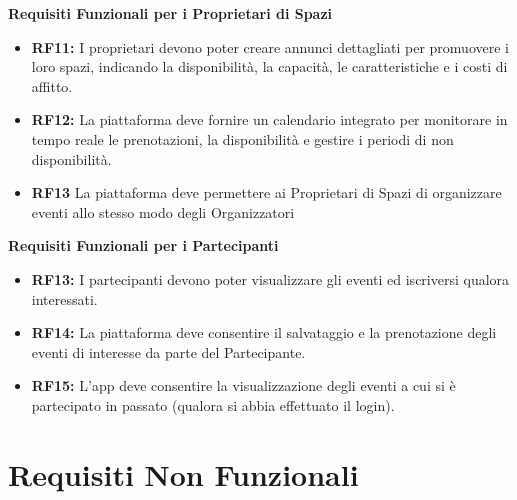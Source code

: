 \documentclass[9pt]{extarticle}
\begin{document}
\textbf{Requisiti Funzionali per i Proprietari di Spazi}
\begin{itemize}
	\item \textbf{RF11:} I proprietari devono poter creare annunci dettagliati per promuovere i loro spazi, indicando la disponibilità, la capacità, le caratteristiche e i costi di affitto.
	\item \textbf{RF12:} La piattaforma deve fornire un calendario integrato per monitorare in tempo reale le prenotazioni, la disponibilità e gestire i periodi di non disponibilità.
    \item \textbf{RF13} La piattaforma deve permettere ai Proprietari di Spazi di organizzare eventi allo stesso modo degli Organizzatori
\end{itemize}


\textbf{Requisiti Funzionali per i Partecipanti}
\begin{itemize}
	\item \textbf{RF13:} I partecipanti devono poter visualizzare gli eventi ed iscriversi qualora interessati.
	\item \textbf{RF14:} La piattaforma deve consentire il salvataggio e la prenotazione degli eventi di interesse da parte del Partecipante.
	\item \textbf{RF15:} L'app deve consentire la visualizzazione degli eventi a cui si è partecipato in passato (qualora si abbia effettuato il login).
\end{itemize}

\section{Requisiti Non Funzionali}
\end{document}
